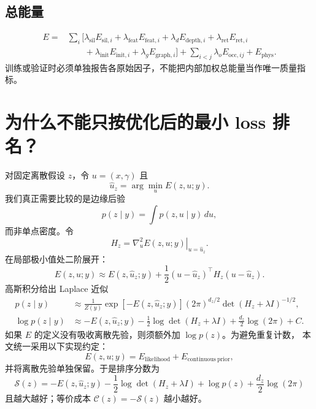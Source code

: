 \documentclass[11pt,a4paper]{ctexart}
\begin{document}
\subsection{总能量}
\begin{align}
 E={}&\sum_i\big[
 \lambda_{\mathrm{sil}}E_{\mathrm{sil},i}
 +\lambda_{\mathrm{feat}}E_{\mathrm{feat},i}
 +\lambda_dE_{\mathrm{depth},i}
 +\lambda_{\mathrm{ret}}E_{\mathrm{ret},i}\nonumber\\
 &\qquad+\lambda_{\mathrm{init}}E_{\mathrm{init},i}
 +\lambda_gE_{\mathrm{graph},i}\big]
 +\sum_{i<j}\lambda_oE_{\mathrm{occ},ij}
 +E_{\mathrm{phys}}.
\end{align}
训练或验证时必须单独报告各原始因子，不能把内部加权总能量当作唯一质量指标。

\section{为什么不能只按优化后的最小 loss 排名？}
对固定离散假设 $z$，令 $u=(x,\gamma)$ 且
\begin{equation}
 \widehat u_z=\arg\min_u E(z,u;y).
\end{equation}
我们真正需要比较的是边缘后验
\begin{equation}
 p(z\mid y)=\int p(z,u\mid y)\,du,
\end{equation}
而非单点密度。令
\begin{equation}
 H_z=\left.\nabla_u^2E(z,u;y)\right|_{u=\widehat u_z}.
\end{equation}
在局部极小值处二阶展开：
\begin{equation}
 E(z,u;y)\approx E(z,\widehat u_z;y)
 +\frac12(u-\widehat u_z)^\top H_z(u-\widehat u_z).
\end{equation}
高斯积分给出 Laplace 近似
\begin{align}
 p(z\mid y)
 &\approx \frac{1}{Z(y)}
 \exp[-E(z,\widehat u_z;y)]
 (2\pi)^{d_z/2}\det(H_z+\lambda I)^{-1/2},\\
 \log p(z\mid y)
 &\approx -E(z,\widehat u_z;y)
 -\frac12\log\det(H_z+\lambda I)
 +\frac{d_z}{2}\log(2\pi)+C.
\end{align}
如果 $E$ 的定义没有吸收离散先验，则须额外加 $\log p(z)$。为避免重复计数，
本文统一采用以下实现约定：
\begin{equation}
 E(z,u;y)=E_{\mathrm{likelihood}}+E_{\mathrm{continuous\ prior}},
\end{equation}
并将离散先验单独保留。于是排序分数为
\begin{equation}
 \boxed{
 \mathcal S(z)=
 -E(z,\widehat u_z;y)
 -\frac12\log\det(H_z+\lambda I)
 +\log p(z)
 +\frac{d_z}{2}\log(2\pi)}
\end{equation}
且越大越好；等价成本 $\mathcal C(z)=-\mathcal S(z)$ 越小越好。
\end{document}
